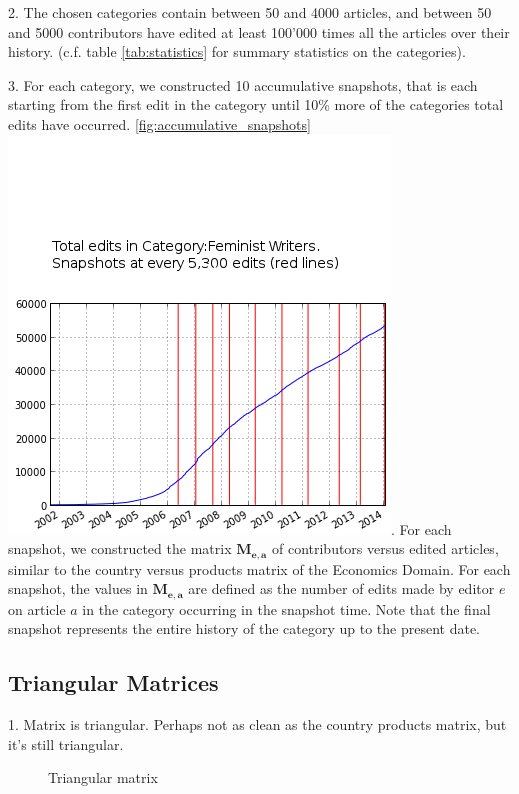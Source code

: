 \documentclass{acm_proc_article-sp}
\begin{document}
2. The chosen categories contain between 50 and 4000 articles, and between 50 and 5000 contributors have edited at least 100'000 times all the articles over their history. (c.f. table \ref{tab:statistics} for summary statistics on the categories). 

3. For each category, we constructed 10 accumulative snapshots, that is each starting from the first edit in the category until 10\% more of the categories total edits have occurred. \ref{fig:accumulative_snapshots}\includegraphics[scale=1]{accumulative snapshot points for Feminist Writers.png}. For each snapshot, we constructed the matrix $\mathbf{M_{e,a}}$ of contributors versus edited articles, similar to the country versus products matrix of the Economics Domain. For each snapshot, the values in $\mathbf{M_{e,a}}$ are defined as the number of edits made by editor $e$ on article $a$ in the category occurring in the snapshot time. Note that the final snapshot represents the entire history of the category up to the present date. 

\subsection{Triangular Matrices}
1. Matrix is triangular.
Perhaps not as clean as the country products matrix, but it's still triangular.

\begin{figure}[!t]
\centering
\caption{Triangular matrix}
\label{fig:triangle_matrix}
\end{figure}
\end{document}
